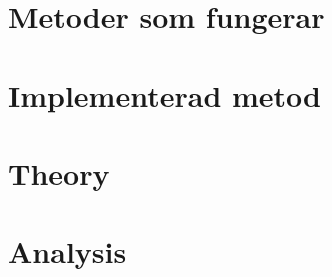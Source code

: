 \section{Metoder som fungerar}





\section{Implementerad metod}









\section{Theory}

\section{Analysis}

%



